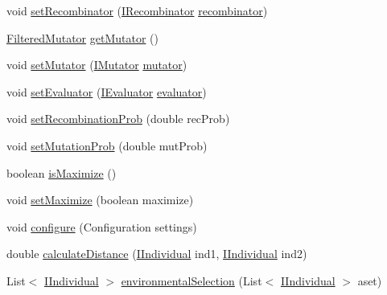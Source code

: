 \begin{DoxyCompactItemize}
\item 
void \hyperlink{classnet_1_1sf_1_1jclec_1_1algorithm_1_1multiobjective_1_1_s_p_e_a2_a7068ad374891a63f4099640976b0227e}{set\-Recombinator} (\hyperlink{interfacenet_1_1sf_1_1jclec_1_1_i_recombinator}{I\-Recombinator} \hyperlink{classnet_1_1sf_1_1jclec_1_1algorithm_1_1multiobjective_1_1_s_p_e_a2_abaabedd4c7063dc7943f6405dc126057}{recombinator})
\item 
\hyperlink{classnet_1_1sf_1_1jclec_1_1base_1_1_filtered_mutator}{Filtered\-Mutator} \hyperlink{classnet_1_1sf_1_1jclec_1_1algorithm_1_1multiobjective_1_1_s_p_e_a2_a5beb950dfc69a6273887dd5fc9362abc}{get\-Mutator} ()
\item 
void \hyperlink{classnet_1_1sf_1_1jclec_1_1algorithm_1_1multiobjective_1_1_s_p_e_a2_abd80a9d5eb77df9f85ec475b8c44ca72}{set\-Mutator} (\hyperlink{interfacenet_1_1sf_1_1jclec_1_1_i_mutator}{I\-Mutator} \hyperlink{classnet_1_1sf_1_1jclec_1_1algorithm_1_1multiobjective_1_1_s_p_e_a2_a5618c231042f9299eeb4a05c28ee25e9}{mutator})
\item 
void \hyperlink{classnet_1_1sf_1_1jclec_1_1algorithm_1_1multiobjective_1_1_s_p_e_a2_aefd83ea76cbbda2da8354411fead3360}{set\-Evaluator} (\hyperlink{interfacenet_1_1sf_1_1jclec_1_1_i_evaluator}{I\-Evaluator} \hyperlink{classnet_1_1sf_1_1jclec_1_1algorithm_1_1_population_algorithm_a9f6c1c4e616e67830292a672907be134}{evaluator})
\item 
void \hyperlink{classnet_1_1sf_1_1jclec_1_1algorithm_1_1multiobjective_1_1_s_p_e_a2_a0238512a5761e609fd86bc47ba6ecfe6}{set\-Recombination\-Prob} (double rec\-Prob)
\item 
void \hyperlink{classnet_1_1sf_1_1jclec_1_1algorithm_1_1multiobjective_1_1_s_p_e_a2_aa4f3979bff18957f2c13dd55cab200fa}{set\-Mutation\-Prob} (double mut\-Prob)
\item 
boolean \hyperlink{classnet_1_1sf_1_1jclec_1_1algorithm_1_1multiobjective_1_1_s_p_e_a2_ad71253f5081e7ade9669888ea51b926a}{is\-Maximize} ()
\item 
void \hyperlink{classnet_1_1sf_1_1jclec_1_1algorithm_1_1multiobjective_1_1_s_p_e_a2_a77cf6646d447cb38fcf3685076b04b2f}{set\-Maximize} (boolean maximize)
\item 
void \hyperlink{classnet_1_1sf_1_1jclec_1_1algorithm_1_1multiobjective_1_1_s_p_e_a2_a197c02ee4b9074cae733e027689da11b}{configure} (Configuration settings)
\item 
double \hyperlink{classnet_1_1sf_1_1jclec_1_1algorithm_1_1multiobjective_1_1_s_p_e_a2_ae40de99900fca18286242cca70dedd1c}{calculate\-Distance} (\hyperlink{interfacenet_1_1sf_1_1jclec_1_1_i_individual}{I\-Individual} ind1, \hyperlink{interfacenet_1_1sf_1_1jclec_1_1_i_individual}{I\-Individual} ind2)
\item 
List$<$ \hyperlink{interfacenet_1_1sf_1_1jclec_1_1_i_individual}{I\-Individual} $>$ \hyperlink{classnet_1_1sf_1_1jclec_1_1algorithm_1_1multiobjective_1_1_s_p_e_a2_aa5308913736698fd383b5df1b38fd09b}{environmental\-Selection} (List$<$ \hyperlink{interfacenet_1_1sf_1_1jclec_1_1_i_individual}{I\-Individual} $>$ aset)
\end{DoxyCompactItemize}
